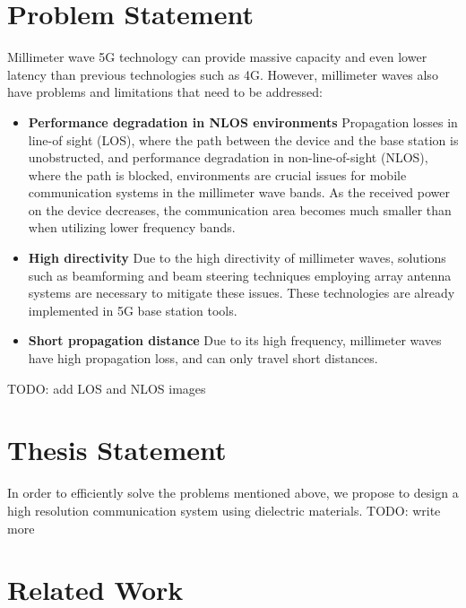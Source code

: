 \documentclass[a4paper,12pt]{report}
\begin{document}
\section{Problem Statement}

Millimeter wave 5G technology can provide massive capacity
and even lower latency than previous technologies such as 4G.
However, millimeter waves also have problems and limitations
that need to be addressed:

\begin{itemize}
  \item[] \textbf{Performance degradation in NLOS environments}
  Propagation losses in line-of sight (LOS),
  where the path between the device and the base station is unobstructed,
  and performance degradation in non-line-of-sight (NLOS),
  where the path is blocked,
  environments are crucial issues for mobile communication
  systems in the millimeter wave bands.
  As the received power on the device decreases,
  the communication area becomes much smaller than when
  utilizing lower frequency bands.
  \item[] \textbf{High directivity}
  Due to the high directivity of millimeter waves,
  solutions such as beamforming and
  beam steering techniques employing array antenna systems
  are necessary to mitigate these issues.
  These technologies are already implemented in 5G base station tools.
  \cite{https://doi.org/10.48550/arxiv.2001.05021}
  \item[] \textbf{Short propagation distance}
  Due to its high frequency,
  millimeter waves have high propagation loss,
  and can only travel short distances.
\end{itemize}


TODO: add LOS and NLOS images

\section{Thesis Statement}

In order to efficiently solve the problems mentioned above,
we propose to design a high resolution communication system
using dielectric materials. 
TODO: write more

\section{Related Work}
\end{document}

